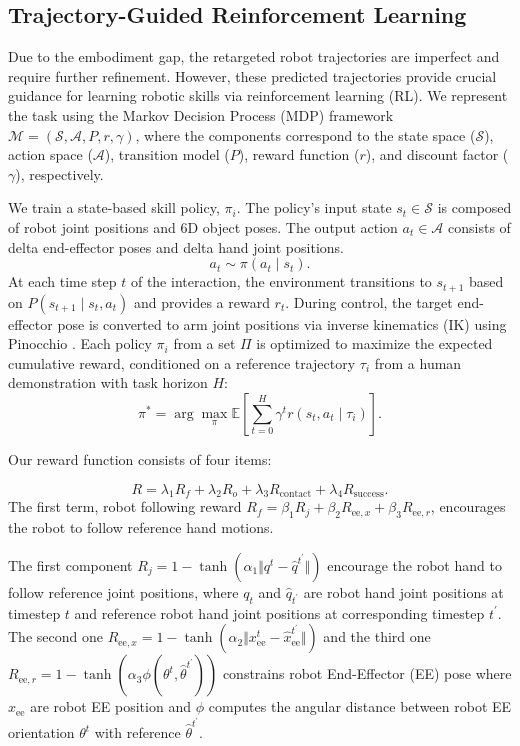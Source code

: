 \documentclass[letterpaper]{article}
\begin{document}
\subsection{Trajectory-Guided Reinforcement Learning}
Due to the embodiment gap, the retargeted robot trajectories are imperfect and require further refinement. However, these predicted trajectories provide crucial guidance for learning robotic skills via reinforcement learning (RL). We represent the task using the Markov Decision Process (MDP) framework $\mathcal{M} = (\mathcal{S}, \mathcal{A}, P, r, \gamma)$, where the components correspond to the state space ($\mathcal{S}$), action space ($\mathcal{A}$), transition model ($P$), reward function ($r$), and discount factor ($\gamma$), respectively.

We train a state-based skill policy, $\pi_i$. The policy's input state $s_t \in \mathcal{S}$ is composed of robot joint positions and 6D object poses. The output action $a_t \in \mathcal{A}$ consists of delta end-effector poses and delta hand joint positions.
\begin{equation*}
    a_t \sim \pi(a_t \mid s_t).
\end{equation*}
At each time step $t$ of the interaction, the environment transitions to $s_{t+1}$ based on $P(s_{t+1} \mid s_t, a_t)$ and provides a reward $r_t$. During control, the target end-effector pose is converted to arm joint positions via inverse kinematics (IK) using Pinocchio \cite{carpentier2019pinocchio}. Each policy $\pi_i$ from a set $\Pi$ is optimized to maximize the expected cumulative reward, conditioned on a reference trajectory $\tau_i$ from a human demonstration with task horizon $H$:
\begin{equation*}
    \pi^* = \arg\max_{\pi} \mathbb{E} \left[ \sum_{t=0}^{H} \gamma^t r(s_t, a_t \mid \tau_i) \right].
\end{equation*}

Our reward function consists of four items:

\begin{equation*}
    R=\lambda_1 R_{f} + \lambda_2 R_{o} +\lambda_3 R_{\text{contact}}  + \lambda_4 R_{\text{success}}.\label{eq:r1}
\end{equation*}The first term, robot following reward $R_f=\beta_1 R_{j} + \beta_2 R_{\text{ee}, x} + \beta_3 R_{\text{ee}, r} \label{eq:r2}$, encourages the robot to follow reference hand motions.

The first component $R_j=1 - \tanh{(\alpha_1 \Vert q^t - \hat{q}^{t^\prime} \Vert)}$ encourage the robot hand to follow reference joint positions, where $q_t$ and $\hat{q}_{t^\prime}$ are robot hand joint positions at timestep $t$ and reference robot hand joint positions at corresponding timestep $t^\prime$. The second one $R_{\text{ee}, x}=1-\tanh{(\alpha_2 \Vert x_{\text{ee}}^t - \hat{x}_{\text{ee}}^{t^\prime}\Vert)}$ and the third one $R_{\text{ee}, r}=1-\tanh{(\alpha_3 \phi (\theta^t, \hat{\theta}^{t^\prime}))}$ constrains robot End-Effector (EE) pose where $x_{\text{ee}}$ are robot EE position and $\phi$ computes the angular distance between robot EE orientation $\theta^t$ with reference $\hat{\theta}^{t^\prime}$.
\end{document}
